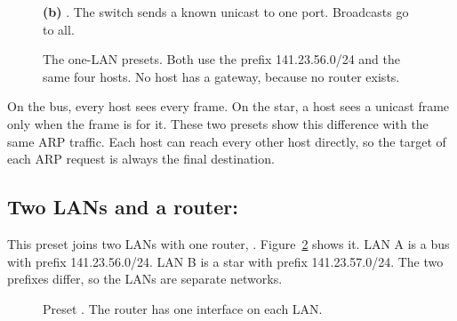 \begin{figure}[H]
\begin{minipage}[t]{0.485\linewidth}
\smallskip
{\small \textbf{(b)} . The switch sends a known unicast to one port. Broadcasts go to all.}
\end{minipage}
\caption{The one-LAN presets. Both use the prefix 141.23.56.0/24 and the same four hosts. No host has a gateway, because no router exists.}
\label{fig:t-single}
\end{figure}

On the bus, every host sees every frame. On the star, a host sees a unicast frame only when the frame is for it. These two presets show this difference with the same ARP traffic. Each host can reach every other host directly, so the target of each ARP request is always the final destination.

\subsection{Two LANs and a router: }
This preset joins two LANs with one router, . Figure~\ref{fig:t-two} shows it. LAN A is a bus with prefix 141.23.56.0/24. LAN B is a star with prefix 141.23.57.0/24. The two prefixes differ, so the LANs are separate networks.

\begin{figure}[H]
\centering
{}
\caption{Preset . The router has one interface on each LAN.}
\label{fig:t-two}
\end{figure}

